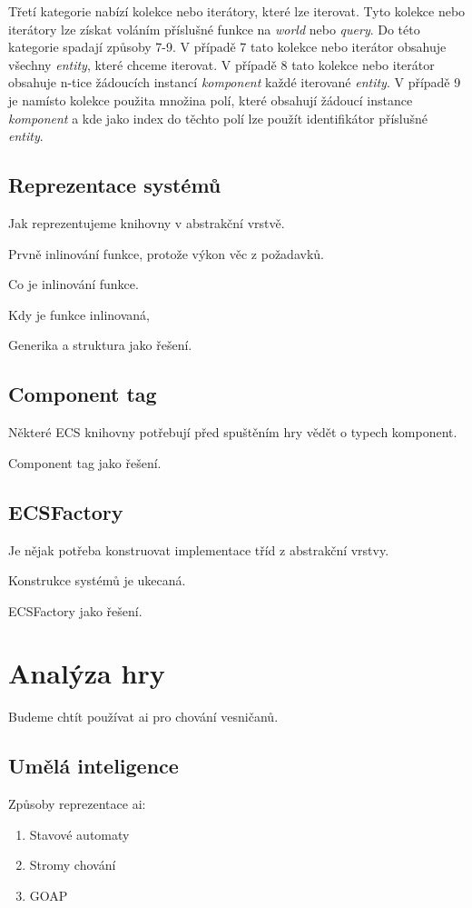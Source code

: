 Třetí kategorie nabízí kolekce nebo iterátory, které lze iterovat. Tyto kolekce nebo iterátory lze získat voláním příslušné funkce na \textit{world} nebo \textit{query}. Do této kategorie spadají způsoby 7-9. V případě 7 tato kolekce nebo iterátor obsahuje všechny \textit{entity}, které chceme iterovat. V případě 8 tato kolekce nebo iterátor obsahuje n-tice žádoucích instancí \textit{komponent} každé iterované \textit{entity}. V případě 9 je namísto kolekce použita množina polí, které obsahují žádoucí instance \textit{komponent} a kde jako index do těchto polí lze použít identifikátor příslušné \textit{entity}.

\subsection{Reprezentace systémů}
Jak reprezentujeme knihovny v abstrakční vrstvě.

Prvně inlinování funkce, protože výkon věc z požadavků.

Co je inlinování funkce.

Kdy je funkce inlinovaná,

Generika a struktura jako řešení.

\subsection{Component tag}
Některé ECS knihovny potřebují před spuštěním hry vědět o typech komponent.

Component tag jako řešení.

\subsection{ECSFactory}
Je nějak potřeba konstruovat implementace tříd z abstrakční vrstvy.

Konstrukce systémů je ukecaná.

ECSFactory jako řešení.

\section{Analýza hry}
Budeme chtít používat ai pro chování vesničanů.

\subsection{Umělá inteligence}
Způsoby reprezentace ai:

\begin{enumerate}
    \item Stavové automaty
    \item Stromy chování
    \item GOAP
\end{enumerate}

